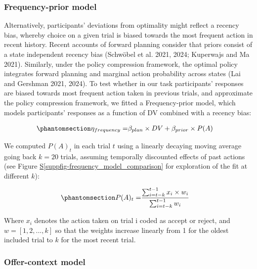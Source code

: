 \documentclass[
  letterpaper,
  DIV=11,
  numbers=noendperiod]{scrartcl}
\newcommand*\quartosuppfigref[1]{Figure \hyperref[#1]{S\ref{#1}}}
\begin{document}
\subsubsection{Frequency-prior model}\label{frequency-prior-model}

Alternatively, participants' deviations from optimality might reflect a
recency bias, whereby choice on a given trial is biased towards the most
frequent action in recent history. Recent accounts of forward planning
consider that priors consist of a state independent recency bias
(Schwöbel et al. 2021, 2024; Kuperwajs and Ma 2021). Similarly, under
the policy compression framework, the optimal policy integrates forward
planning and marginal action probability across states (Lai and Gershman
2021, 2024). To test whether in our task participants' responses are
biased towards most frequent action taken in previous trials, and
approximate the policy compression framework, we fitted a
Frequency-prior model, which models participants' responses as a
function of DV combined with a recency bias:

\begin{equation}\protect\phantomsection\label{eq-frequency-model}{
\begin{aligned}
\eta_{frequency} =& \beta_{plan} \times DV + \beta_{prior} \times P(A)
\end{aligned}
}\end{equation}

We computed \(P(A)_t\) in each trial \(t\) using a linearly decaying
moving average going back \(k=20\) trials, assuming temporally
discounted effects of past actions (see
\quartosuppfigref{suppfig-frequency_model_comparison} for exploration of
the fit at different \(k\)):

\begin{equation}\protect\phantomsection\label{eq-mvavg}{
\begin{aligned}
P(A)_t =& \frac{\sum_{i=t-k}^{t-1}x_i \times w_i}{\sum_{i=t-k}^{t-1}w_i}
\end{aligned}
}\end{equation}

Where \(x_i\) denotes the action taken on trial i coded as accept or
reject, and \(w=[1, 2, ..., k]\) so that the weights increase linearly
from 1 for the oldest included trial to \(k\) for the most recent trial.

\subsubsection{Offer-context model}\label{offer-context-model}
\end{document}
